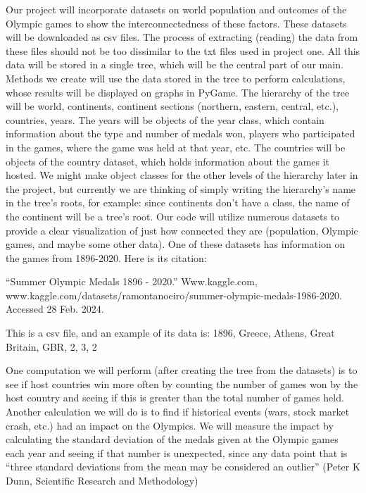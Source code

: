 \documentclass[fontsize=11pt]{article}
\begin{document}
Our project will incorporate datasets on world population and outcomes of the Olympic games to show the interconnectedness of these factors. These datasets will be downloaded as csv files. The process of extracting (reading) the data from these files should not be too dissimilar to the txt files used in project one. All this data will be stored in a single tree, which will be the central part of our main. Methods we create will use the data stored in the tree to perform calculations, whose results will be displayed on graphs in PyGame. The hierarchy of the tree will be world, continents, continent sections (northern, eastern, central, etc.), countries, years. The years will be objects of the year class, which contain information about the type and number of medals won, players who participated in the games, where the game was held at that year, etc. The countries will be objects of the country dataset, which holds information about the games it hosted. We might make object classes for the other levels of the hierarchy later in the project, but currently we are thinking of simply writing the hierarchy's name in the tree's roots, for example: since continents don't have a class, the name of the continent will be a tree's root. Our code will utilize numerous datasets to provide a clear visualization of just how connected they are (population, Olympic games, and maybe some other data). One of these datasets has information on the games from 1896-2020. Here is its citation: 

  

“Summer Olympic Medals 1896 - 2020.” Www.kaggle.com, www.kaggle.com/datasets/ramontanoeiro/summer-olympic-medals-1986-2020. Accessed 28 Feb. 2024. 

  

This is a csv file, and an example of its data is: 1896, Greece, Athens, Great Britain, GBR, 2, 3, 2 

  

One computation we will perform (after creating the tree from the datasets) is to see if host countries win more often by counting the number of games won by the host country and seeing if this is greater than the total number of games held. Another calculation we will do is to find if historical events (wars, stock market crash, etc.) had an impact on the Olympics. We will measure the impact by calculating the standard deviation of the medals given at the Olympic games each year and seeing if that number is unexpected, since any data point that is “three standard deviations from the mean may be considered an outlier” (Peter K Dunn, Scientific Research and Methodology) 
\end{document}
